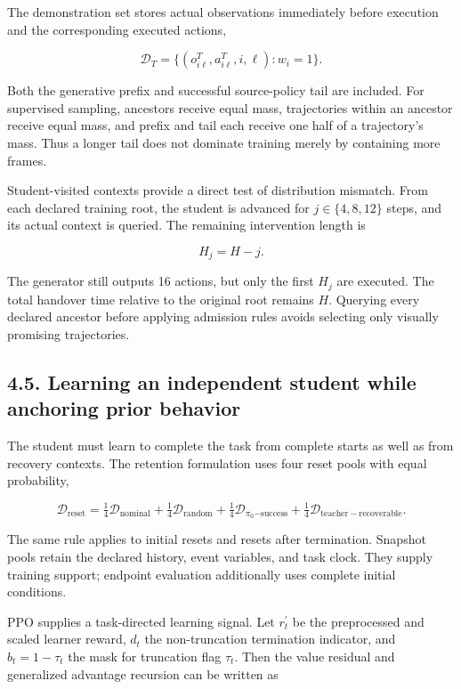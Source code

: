 \documentclass[
  american,
  11pt,
  a4paper,
]{article}
\begin{document}
The demonstration set stores actual observations immediately before
execution and the corresponding executed actions,

\[
\mathcal D_T=\{(o_{i\ell}^{T},a_{i\ell}^{T},i,\ell):w_i=1\}.
\tag{22}\label{eq:22}
\]

Both the generative prefix and successful source-policy tail are
included. For supervised sampling, ancestors receive equal mass,
trajectories within an ancestor receive equal mass, and prefix and tail
each receive one half of a trajectory's mass. Thus a longer tail does
not dominate training merely by containing more frames.

Student-visited contexts provide a direct test of distribution mismatch.
From each declared training root, the student is advanced for
\(j\in\{4,8,12\}\) steps, and its actual context is queried. The
remaining intervention length is

\[
H_j=H-j.
\tag{23}\label{eq:23}
\]

The generator still outputs 16 actions, but only the first \(H_j\) are
executed. The total handover time relative to the original root remains
\(H\). Querying every declared ancestor before applying admission rules
avoids selecting only visually promising trajectories.

\subsection{4.5. Learning an independent student while anchoring prior
behavior}\label{learning-an-independent-student-while-anchoring-prior-behavior}

The student must learn to complete the task from complete starts as well
as from recovery contexts. The retention formulation uses four reset
pools with equal probability,

\[
\mathcal D_{\mathrm{reset}}
=\tfrac14\mathcal D_{\mathrm{nominal}}
+\tfrac14\mathcal D_{\mathrm{random}}
+\tfrac14\mathcal D_{\pi_0{\mathrm{-success}}}
+\tfrac14\mathcal D_{\mathrm{teacher-recoverable}}.
\tag{24}\label{eq:24}
\]

The same rule applies to initial resets and resets after termination.
Snapshot pools retain the declared history, event variables, and task
clock. They supply training support; endpoint evaluation additionally
uses complete initial conditions.

PPO \cite{schulman2017ppo} supplies a task-directed learning signal. Let
\(r_t^\prime\) be the preprocessed and scaled learner reward, \(d_t\)
the non-truncation termination indicator, and \(b_t=1-\tau_t\) the mask
for truncation flag \(\tau_t\). Then the value residual and generalized
advantage recursion \cite{schulman2016gae} can be written as
\end{document}
